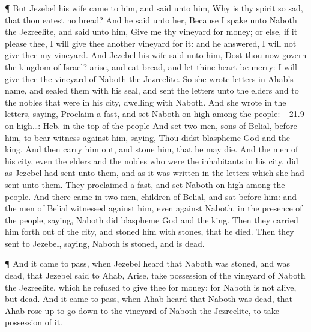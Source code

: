  ¶ But Jezebel his wife came to him, and said unto him, Why
is thy spirit so sad, that thou eatest no bread?  And he
said unto her, Because I spake unto Naboth the Jezreelite, and said unto
him, Give me thy vineyard for money; or else, if it please thee, I will
give thee another vineyard for it: and he answered, I will not give thee
my vineyard.  And Jezebel his wife said unto him, Dost thou
now govern the kingdom of Israel? arise, and eat bread, and let thine
heart be merry: I will give thee the vineyard of Naboth the Jezreelite.
 So she wrote letters in Ahab's name, and sealed them with
his seal, and sent the letters unto the elders and to the nobles that
were in his city, dwelling with Naboth.  And she wrote in
the letters, saying, Proclaim a fast, and set Naboth on high among the
people:+ 21.9 on high\ldots: Heb. in the top of the people 
And set two men, sons of Belial, before him, to bear witness against
him, saying, Thou didst blaspheme God and the king. And then carry him
out, and stone him, that he may die.  And the men of his
city, even the elders and the nobles who were the inhabitants in his
city, did as Jezebel had sent unto them, and as it was written in the
letters which she had sent unto them.  They proclaimed a
fast, and set Naboth on high among the people.  And there
came in two men, children of Belial, and sat before him: and the men of
Belial witnessed against him, even against Naboth, in the presence of
the people, saying, Naboth did blaspheme God and the king. Then they
carried him forth out of the city, and stoned him with stones, that he
died.  Then they sent to Jezebel, saying, Naboth is stoned,
and is dead.

 ¶ And it came to pass, when Jezebel heard that Naboth was
stoned, and was dead, that Jezebel said to Ahab, Arise, take possession
of the vineyard of Naboth the Jezreelite, which he refused to give thee
for money: for Naboth is not alive, but dead.  And it came
to pass, when Ahab heard that Naboth was dead, that Ahab rose up to go
down to the vineyard of Naboth the Jezreelite, to take possession of it.

